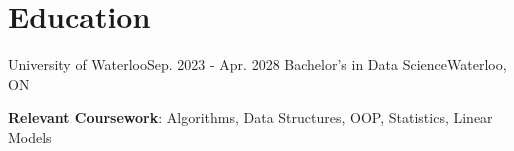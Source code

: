 \section{Education}
  \resumeSubHeadingListStart
    \resumeSubheading
      {University of Waterloo}{Sep. 2023 - Apr. 2028}
      {Bachelor's in Data Science}{Waterloo, ON}
      
  \begin{itemize}[leftmargin=0.15in, label={}]
    \small{\item{
        \textbf{Relevant Coursework}{: Algorithms, Data Structures, OOP, Statistics, Linear Models} \\
    }}
  \end{itemize}
  \resumeSubHeadingListEnd
